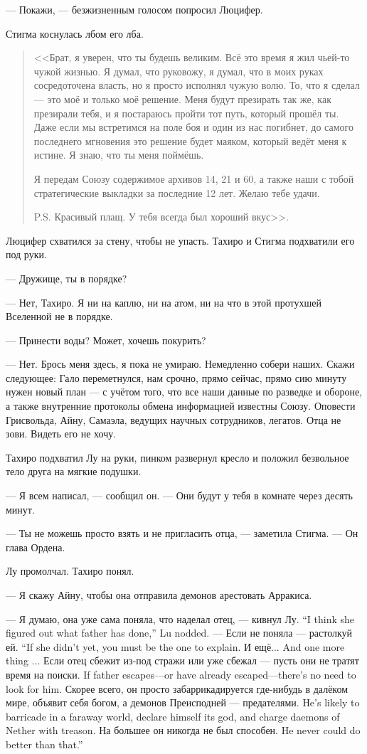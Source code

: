 --- Покажи, --- безжизненным голосом попросил Люцифер.

Стигма коснулась лбом его лба.

\begin{quote}
<<Брат, я уверен, что ты будешь великим.
Всё это время я жил чьей-то чужой жизнью.
Я думал, что руковожу, я думал, что в моих руках сосредоточена власть, но я просто исполнял чужую волю.
То, что я сделал --- это моё и только моё решение.
Меня будут презирать так же, как презирали тебя, и я постараюсь пройти тот путь, который прошёл ты.
Даже если мы встретимся на поле боя и один из нас погибнет, до самого последнего мгновения это решение будет маяком, который ведёт меня к истине.
Я знаю, что ты меня поймёшь.

Я передам Союзу содержимое архивов 14, 21 и 60, а также наши с тобой стратегические выкладки за последние 12 лет.
Желаю тебе удачи.

P.S. Красивый плащ.
У тебя всегда был хороший вкус>>.
\end{quote}

Люцифер схватился за стену, чтобы не упасть.
Тахиро и Стигма подхватили его под руки.

--- Дружище, ты в порядке?

--- Нет, Тахиро.
Я ни на каплю, ни на атом, ни на что в этой протухшей Вселенной не в порядке.

--- Принести воды?
Может, хочешь покурить?

--- Нет.
Брось меня здесь, я пока не умираю.
Немедленно собери наших.
Скажи следующее: Гало переметнулся, нам срочно, прямо сейчас, прямо сию минуту нужен новый план --- с учётом того, что все наши данные по разведке и обороне, а также внутренние протоколы обмена информацией известны Союзу.
Оповести Грисвольда, Айну, Самаэла, ведущих научных сотрудников, легатов.
Отца не зови.
Видеть его не хочу.

Тахиро подхватил Лу на руки, пинком развернул кресло и положил безвольное тело друга на мягкие подушки.

--- Я всем написал, --- сообщил он.
--- Они будут у тебя в комнате через десять минут.

--- Ты не можешь просто взять и не пригласить отца, --- заметила Стигма.
--- Он глава Ордена.

Лу промолчал.
Тахиро понял.

--- Я скажу Айну, чтобы она отправила демонов арестовать Арракиса.

{--- Я думаю, она уже сама поняла, что наделал отец, --- кивнул Лу.}
{``I think she figured out what father has done,'' Lu nodded.}
{--- Если не поняла --- растолкуй ей.}
{``If she didn't yet, you must be the one to explain.}
{И ещё... }
{And one more thing ...}
{Если отец сбежит из-под стражи или уже сбежал --- пусть они не тратят время на поиски.}
{If father escapes---or have already escaped---there's no need to look for him.}
{Скорее всего, он просто забаррикадируется где-нибудь в далёком мире, объявит себя богом, а демонов Преисподней --- предателями.}
{He's likely to barricade in a faraway world, declare himself its god, and charge daemons of Nether with treason.}
{На большее он никогда не был способен.}
{He never could do better than that.''}

